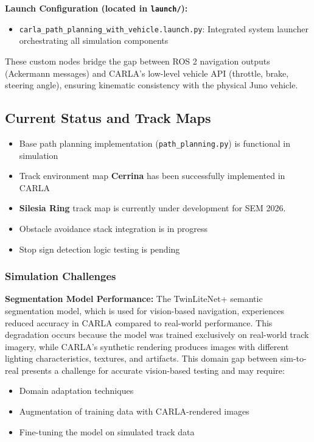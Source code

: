 \textbf{Launch Configuration (located in \texttt{launch/}):}
\begin{itemize}
    \item \texttt{carla\_path\_planning\_with\_vehicle.launch.py}: Integrated system launcher orchestrating all simulation components
\end{itemize}

These custom nodes bridge the gap between ROS 2 navigation outputs (Ackermann messages) and CARLA's low-level vehicle API (throttle, brake, steering angle), ensuring kinematic consistency with the physical Juno vehicle.

\subsection{Current Status and Track Maps}
\begin{itemize}
    \item Base path planning implementation (\texttt{path\_planning.py}) is functional in simulation
    \item Track environment map \textbf{Cerrina} has been successfully implemented in CARLA
    \item \textbf{Silesia Ring} track map is currently under development for SEM 2026.
    \item Obstacle avoidance stack integration is in progress
    \item Stop sign detection logic testing is pending
\end{itemize}

\subsubsection{Simulation Challenges}
\textbf{Segmentation Model Performance:} The TwinLiteNet+ semantic segmentation model, which is used for vision-based navigation, experiences reduced accuracy in CARLA compared to real-world performance. This degradation occurs because the model was trained exclusively on real-world track imagery, while CARLA's synthetic rendering produces images with different lighting characteristics, textures, and artifacts. This domain gap between sim-to-real presents a challenge for accurate vision-based testing and may require:
\begin{itemize}
    \item Domain adaptation techniques
    \item Augmentation of training data with CARLA-rendered images
    \item Fine-tuning the model on simulated track data
\end{itemize}

